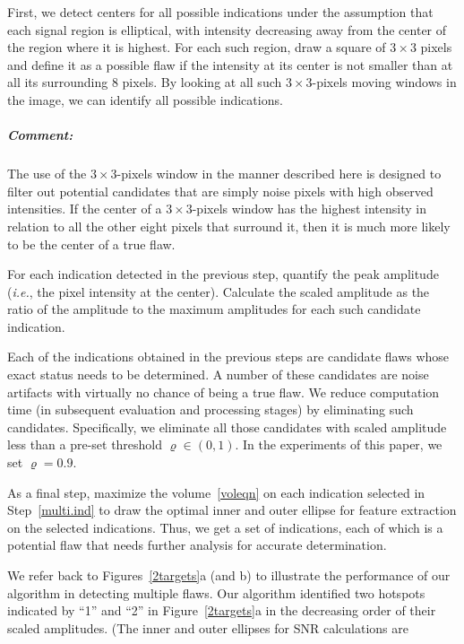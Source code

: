 \documentclass[12pt]{article}
\newenvironment{packed_enum}{
\begin{enumerate}[leftmargin=1.2em]
  \setlength{\itemsep}{1pt}
  \setlength{\parskip}{0pt}
  \setlength{\parsep}{0pt}
}{\end{enumerate}}
\begin{document}
\begin{packed_enum}
\item First, we detect centers for all possible 
  indications under the assumption that each  signal region is elliptical, with
  intensity decreasing away from the center of the region where it is
  highest. For each such region, draw a square of $3\times 3$ 
  pixels and define it as  a  possible flaw if the intensity at its 
  center is not smaller than at all its surrounding 8 pixels. By
  looking at  all such $3\times 3$-pixels moving windows in  the image, we
  can identify all possible indications.  
\subparagraph{Comment:} The use of the $3\times 3$-pixels window in the
manner described here is designed to filter out potential candidates
that are simply noise pixels with high observed intensities. If the
center of a $3\times 3$-pixels window has the highest intensity in
relation to all the other eight pixels that surround it, then it is
much more likely to be the center of a true flaw. 
\item 
For each indication detected in the previous step, quantify the peak
amplitude ({\em i.e.}, the pixel intensity at the center). Calculate
the  scaled amplitude as the ratio of the amplitude to the maximum
amplitudes for each such candidate indication.
\item
  \label{multi.ind}
Each of the indications obtained in the previous steps are candidate
flaws whose exact status needs to be determined. A  number of these
candidates are noise artifacts with virtually no chance of being a
true flaw. We reduce computation time 
(in subsequent evaluation and processing stages) by eliminating such
candidates. Specifically, 
we eliminate all those candidates  with scaled amplitude less than a
pre-set threshold $\varrho\in(0, 1)$. In the experiments of this
paper, we set $\varrho=0.9$.  
\item 
  As a final step, maximize the volume~\eqref{voleqn} on each
  indication selected in Step~\ref{multi.ind} to draw the optimal
  inner   and outer ellipse for feature extraction on the selected
  indications. Thus, we get a set of indications, each of which is a
  potential flaw that needs further analysis for accurate determination.
\end{packed_enum}
We refer back to Figures~\ref{2targets}a (and b) to illustrate the performance
of our algorithm in detecting multiple flaws. Our algorithm identified
two hotspots indicated by ``1'' and ``2'' in Figure~\ref{2targets}a in
the decreasing order of their scaled 
amplitudes.  (The inner and outer ellipses for SNR calculations are
\end{document}
